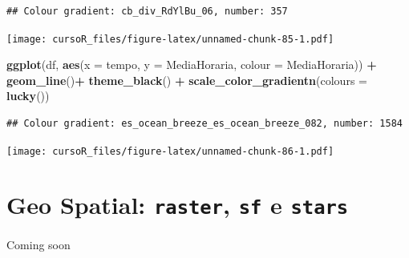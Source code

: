 \documentclass[]{book}
\newenvironment{Shaded}{\begin{snugshade}}{\end{snugshade}}
\newcommand{\KeywordTok}[1]{\textcolor[rgb]{0.13,0.29,0.53}{\textbf{#1}}}
\newcommand{\DataTypeTok}[1]{\textcolor[rgb]{0.13,0.29,0.53}{#1}}
\newcommand{\StringTok}[1]{\textcolor[rgb]{0.31,0.60,0.02}{#1}}
\newcommand{\OperatorTok}[1]{\textcolor[rgb]{0.81,0.36,0.00}{\textbf{#1}}}
\newcommand{\NormalTok}[1]{#1}
\begin{document}
\begin{verbatim}
## Colour gradient: cb_div_RdYlBu_06, number: 357
\end{verbatim}

\texttt{[image: cursoR\_files/figure-latex/unnamed-chunk-85-1.pdf]}

\begin{Shaded}
\begin{Highlighting}[]
\KeywordTok{ggplot}\NormalTok{(df, }\KeywordTok{aes}\NormalTok{(}\DataTypeTok{x =}\NormalTok{ tempo, }\DataTypeTok{y =}\NormalTok{ MediaHoraria, }\DataTypeTok{colour =}\NormalTok{ MediaHoraria)) }\OperatorTok{+}\StringTok{ }
\StringTok{  }\KeywordTok{geom_line}\NormalTok{()}\OperatorTok{+}
\StringTok{  }\KeywordTok{theme_black}\NormalTok{() }\OperatorTok{+}
\StringTok{  }\KeywordTok{scale_color_gradientn}\NormalTok{(}\DataTypeTok{colours =} \KeywordTok{lucky}\NormalTok{())}
\end{Highlighting}
\end{Shaded}

\begin{verbatim}
## Colour gradient: es_ocean_breeze_es_ocean_breeze_082, number: 1584
\end{verbatim}

\texttt{[image: cursoR\_files/figure-latex/unnamed-chunk-86-1.pdf]}

\chapter{\texorpdfstring{Geo Spatial: \texttt{raster}, \texttt{sf} e
\texttt{stars}}{Geo Spatial: raster, sf e stars}}\label{geo-spatial-raster-sf-e-stars}

Coming soon


\end{document}
